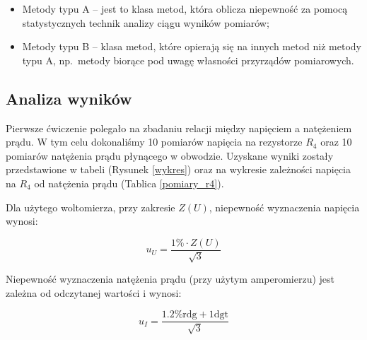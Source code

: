 \documentclass[a4paper]{article}
\newlength{\du}
\begin{document}
\begin{itemize}
\item Metody typu A -- jest to klasa metod, która oblicza niepewność za pomocą statystycznych technik analizy ciągu 	wyników pomiarów;
\item Metody typu B -- klasa metod, które opierają się na innych metod niż metody typu A, np.~metody biorące pod uwagę własności przyrządów pomiarowych.
\end{itemize}

\subsection{Analiza wyników}

Pierwsze ćwiczenie polegało na zbadaniu relacji między napięciem a natężeniem prądu.
W tym celu dokonaliśmy 10 pomiarów napięcia na rezystorze $R_4$ oraz 10 pomiarów natężenia prądu płynącego w obwodzie.
Uzyskane wyniki zostały przedstawione w tabeli (Rysunek \ref{wykres}) oraz na wykresie zależności napięcia na $R_4$ od natężenia prądu (Tablica \ref{pomiary_r4}).


\newpage

Dla użytego woltomierza, przy zakresie $Z(U)$, niepewność wyznaczenia napięcia wynosi:

$$u_U = \frac{1\% \cdot Z(U)}{\sqrt{3}}$$

Niepewność wyznaczenia natężenia prądu (przy użytym amperomierzu) jest zależna od odczytanej wartości i wynosi:

$$u_I = \frac{1.2\% \text{rdg} + 1 \text{dgt}}{\sqrt{3}}$$
\end{document}
